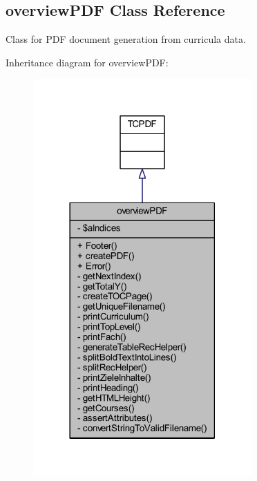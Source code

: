 \hypertarget{classoverview_p_d_f}{\subsection{overview\+P\+D\+F Class Reference}
\label{classoverview_p_d_f}
}


Class for P\+D\+F document generation from curricula data.  




Inheritance diagram for overview\+P\+D\+F\+:
\nopagebreak
\begin{figure}[H]
\begin{center}
\leavevmode
\includegraphics[width=237pt]{classoverview_p_d_f__inherit__graph}
\end{center}
\end{figure}


